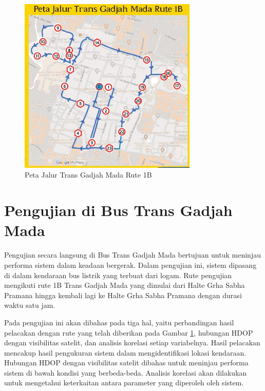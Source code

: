 \begin{figure}[H]
	\centering
	\includegraphics[width=8.5cm]{contents/chapter-4/pengujian-bergerak/Peta-Jalur-Rute-1B.jpg}
	\caption{Peta Jalur Trans Gadjah Mada Rute 1B}
	\label{Fig: peta-1b}
\end{figure}

\section{Pengujian di Bus Trans Gadjah Mada}
Pengujian secara langsung di Bus Trans Gadjah Mada bertujuan untuk meninjau performa sistem dalam keadaan bergerak. Dalam pengujian ini, sistem dipasang di dalam kendaraan bus listrik yang terbuat dari logam. Rute pengujian mengikuti rute 1B Trans Gadjah Mada yang dimulai dari Halte Grha Sabha Pramana hingga kembali lagi ke Halte Grha Sabha Pramana dengan durasi waktu satu jam.

Pada pengujian ini akan dibahas pada tiga hal, yaitu perbandingan hasil pelacakan dengan rute yang telah diberikan pada Gambar \ref{Fig: peta-1b}, hubungan HDOP dengan visibilitas satelit, dan analisis korelasi setiap variabelnya. Hasil pelacakan mencakup hasil pengukuran sistem dalam mengidentifikasi lokasi kendaraan. Hubungan HDOP dengan visibilitas satelit dibahas untuk meninjau performa sistem di bawah kondisi yang berbeda-beda. Analisis korelasi akan dilakukan untuk mengetahui keterkaitan antara parameter yang diperoleh oleh sistem.

